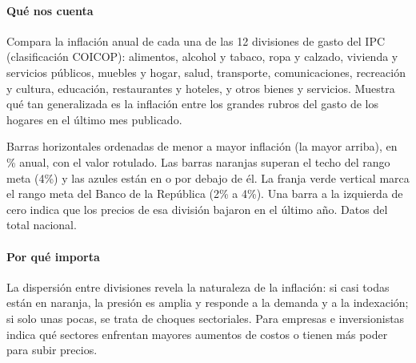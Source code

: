 \paragraph{Qué nos cuenta}
Compara la inflación anual de cada una de las 12 divisiones de gasto del IPC (clasificación COICOP): alimentos, alcohol y tabaco, ropa y calzado, vivienda y servicios públicos, muebles y hogar, salud, transporte, comunicaciones, recreación y cultura, educación, restaurantes y hoteles, y otros bienes y servicios. Muestra qué tan generalizada es la inflación entre los grandes rubros del gasto de los hogares en el último mes publicado.

\begin{leer}
Barras horizontales ordenadas de menor a mayor inflación (la mayor arriba), en \% anual, con el valor rotulado. Las barras naranjas superan el techo del rango meta (4\%) y las azules están en o por debajo de él. La franja verde vertical marca el rango meta del Banco de la República (2\% a 4\%). Una barra a la izquierda de cero indica que los precios de esa división bajaron en el último año. Datos del total nacional.
\end{leer}

\paragraph{Por qué importa}
La dispersión entre divisiones revela la naturaleza de la inflación: si casi todas están en naranja, la presión es amplia y responde a la demanda y a la indexación; si solo unas pocas, se trata de choques sectoriales. Para empresas e inversionistas indica qué sectores enfrentan mayores aumentos de costos o tienen más poder para subir precios.

